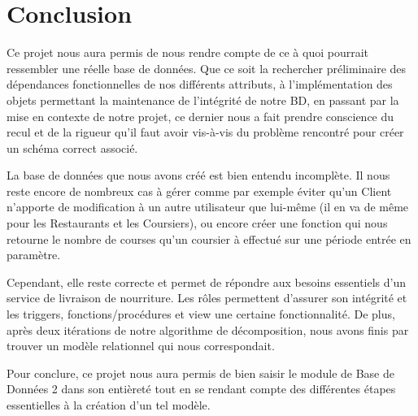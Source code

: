 \documentclass[french]{article}
\begin{document}
    \section{Conclusion}
        Ce projet nous aura permis de nous rendre compte de ce à quoi pourrait ressembler une réelle base de données. Que ce soit la rechercher préliminaire des dépendances fonctionnelles de nos différents attributs, à l'implémentation des objets permettant la maintenance de l'intégrité de notre BD, en passant par la mise en contexte de notre projet, ce dernier nous a fait prendre conscience du recul et de la rigueur qu'il faut avoir vis-à-vis du problème rencontré pour créer un schéma correct associé.\smallskip
        
        \noindent La base de données que nous avons créé est bien entendu incomplète. Il nous reste encore de nombreux cas à gérer comme par exemple éviter qu'un Client n'apporte de modification à un autre utilisateur que lui-même (il en va de même pour les Restaurants et les Coursiers), ou encore créer une fonction qui nous retourne le nombre de courses qu'un coursier à effectué sur une période entrée en paramètre.\smallskip
  
        \noindent Cependant, elle reste correcte et permet de répondre aux besoins essentiels d'un service de livraison de nourriture. Les rôles permettent d'assurer son intégrité et les triggers, fonctions/procédures et view une certaine fonctionnalité. De plus, après deux itérations de notre algorithme de décomposition, nous avons finis par trouver un modèle relationnel qui nous correspondait.\smallskip

        \noindent Pour conclure, ce projet nous aura permis de bien saisir le module de Base de Données 2 dans son entièreté tout en se rendant compte des différentes étapes essentielles à la création d'un tel modèle.\newpage
\end{document}
